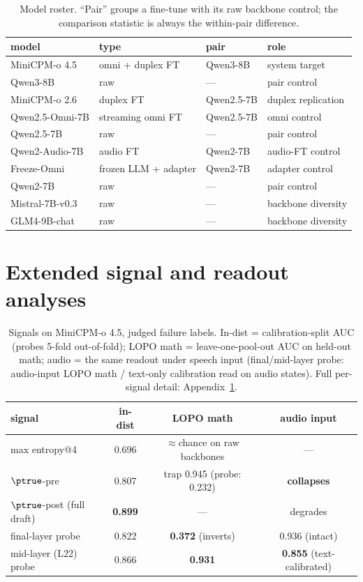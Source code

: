 \begin{table}[h]
\centering\small
\caption{Model roster. ``Pair'' groups a fine-tune with its raw backbone
control; the comparison statistic is always the within-pair difference.}
\label{tab:models}
\begin{tabular}{llll}
\toprule
model & type & pair & role \\
\midrule
MiniCPM-o 4.5 & omni + duplex FT & Qwen3-8B & system target \\
Qwen3-8B & raw & --- & pair control \\
MiniCPM-o 2.6 & duplex FT & Qwen2.5-7B & duplex replication \\
Qwen2.5-Omni-7B & streaming omni FT & Qwen2.5-7B & omni control \\
Qwen2.5-7B & raw & --- & pair control \\
Qwen2-Audio-7B & audio FT & Qwen2-7B & audio-FT control \\
Freeze-Omni & frozen LLM + adapter & Qwen2-7B & adapter control \\
Qwen2-7B & raw & --- & pair control \\
Mistral-7B-v0.3 & raw & --- & backbone diversity \\
GLM4-9B-chat & raw & --- & backbone diversity \\
\bottomrule
\end{tabular}
\end{table}

\section{Extended signal and readout analyses}
\label{app:signal}

\begin{table}[h]
\centering\footnotesize
\caption{Signals on MiniCPM-o 4.5, judged failure labels. In-dist =
calibration-split AUC (probes 5-fold out-of-fold); LOPO math =
leave-one-pool-out AUC on held-out math; audio = the same readout under
speech input (final/mid-layer probe: audio-input LOPO math / text-only
calibration read on audio states). Full per-signal detail:
Appendix~\ref{app:signal}.}
\label{tab:signals}
\begin{tabular}{lccc}
\toprule
signal & in-dist & LOPO math & audio input \\
\midrule
max entropy@4 & 0.696 & $\approx$chance on raw backbones & --- \\
$\ptrue$-pre & 0.807 & trap 0.945 (probe: 0.232) & \textbf{collapses} \\
$\ptrue$-post (full draft) & \textbf{0.899} & --- & degrades \\
final-layer probe & 0.822 & \textbf{0.372} (inverts) & 0.936 (intact) \\
mid-layer (L22) probe & 0.866 & \textbf{0.931} & \textbf{0.855} (text-calibrated) \\
\bottomrule
\end{tabular}
\end{table}


